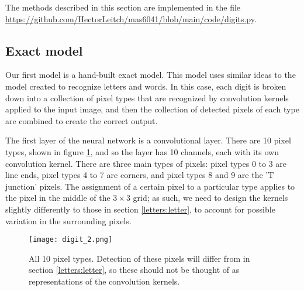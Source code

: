 \documentclass{somasmsc}
\begin{document}
The methods described in this section are implemented in the file \url{https://github.com/HectorLeitch/mas6041/blob/main/code/digits.py}.

\subsection{Exact model}

Our first model is a hand-built exact model. This model uses similar ideas to the model created to recognize letters and words. In this case, each digit is broken down into a collection of pixel types that are recognized by convolution kernels applied to the input image, and then the collection of detected pixels of each type are combined to create the correct output.

The first layer of the neural network is a convolutional layer. There are 10 pixel types, shown in figure \ref{digit:fig2}, and so the layer has 10 channels, each with its own convolution kernel. There are three main types of pixels: pixel types 0 to 3 are line ends, pixel types 4 to 7 are corners, and pixel types 8 and 9 are the 'T junction' pixels. The assignment of a certain pixel to a particular type applies to the pixel in the middle of the $3 \times 3$ grid; as such, we need to design the kernels slightly differently to those in section \ref{letters:letter}, to account for possible variation in the surrounding pixels.

\begin{figure}[H]\label{digit:fig2}
\begin{center}
\texttt{[image: digit\_2.png]}
\end{center}
\caption{All 10 pixel types. Detection of these pixels will differ from in section \ref{letters:letter}, so these should not be thought of as representations of the convolution kernels.}
\end{figure}
\end{document}

